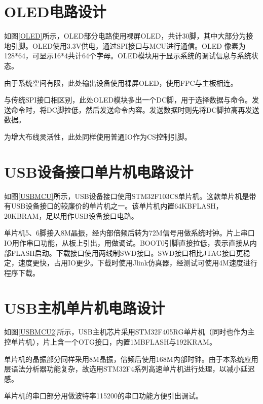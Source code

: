 \section{OLED电路设计}
如图\ref{OLED}所示，OLED部分电路使用裸屏OLED，共计30脚，其中大部分为接地引脚。OLED使用3.3V供电，通过SPI接口与MCU进行通信。OLED 像素为128*64，可显示16*4共计64个字母。OLED模块用于显示系统的调试信息与系统状态。

由于系统空间有限，此处输出设备使用裸屏OLED，使用FPC与主板相连。

与传统SPI接口相区别，此处OLED模块多出一个DC脚，用于选择数据与命令。发送命令时，将DC脚拉低，然后发送命令内容。发送数据时则先将DC脚拉高再发送数据。

为增大布线灵活性，此处同样使用普通IO作为CS控制引脚。

\section{USB设备接口单片机电路设计}
如图\ref{USBMCU}所示，USB设备接口使用STM32F103C8单片机。这款单片机是带有USB设备接口的较廉价的单片机之一。该单片机内置64KBFLASH，20KBRAM，足以用作USB设备接口电路。

单片机5、6脚接入8M晶振，经内部倍频后转为72M信号用做系统时钟。片上串口IO用作串口功能，从板上引出，用做调试。BOOT0引脚直接拉低，表示直接从内部FLASH启动。下载接口使用两线制SWD接口。SWD接口相比JTAG接口更稳定，速度更快，占用IO更少。下载时使用Jlink仿真器，经测试可使用4M速度进行程序下载。

\section{USB主机单片机电路设计}

如图\ref{USBMCU2}所示，USB主机芯片采用STM32F405RG单片机（同时也作为主控单片机），片上含一个OTG接口，内置1MBFLASH与192KRAM。

单片机的晶振部分同样采用8M晶振，倍频后使用168M内部时钟。由于本系统应用层语法分析器功能复杂，故选用STM32F4系列高速单片机进行处理，以减小延迟感。

单片机的串口部分用做波特率115200的串口功能方便引出调试。




